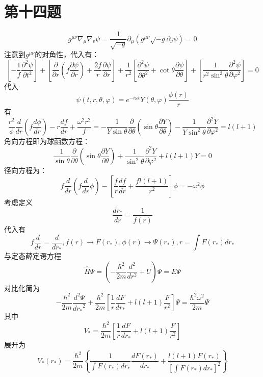 \documentclass[a4paper]{ctexart}
\begin{document}
\section{第十四题}
$$
    g^{\mu \nu}\nabla _{\mu}\nabla _v\psi =\frac{1}{\sqrt{-g}}\partial _{\mu}\left( g^{\mu \nu}\sqrt{-g}\partial _{\nu}\psi \right) =0
$$
注意到$g^{\mu \nu}$的对角性，代入有：
$$
    \left[ -\frac{1}{f}\frac{\partial ^2\psi}{\partial t^2} \right] +\left[ \frac{\partial}{\partial r}\left( f\frac{\partial \psi}{\partial r} \right) +\frac{2f}{r}\frac{\partial \psi}{\partial r} \right] +\frac{1}{r^2}\left[ \frac{\partial ^2\psi}{\partial \theta ^2}+\cot \theta \frac{\partial \psi}{\partial \theta} \right] +\left[ \frac{1}{r^2\sin ^2\theta}\frac{\partial ^2\psi}{\partial \varphi ^2} \right] =0
$$
代入
$$
    \psi \left( t,r,\theta ,\varphi \right) =e^{-i\omega t}Y\left( \theta ,\varphi \right) \frac{\phi \left( r \right)}{r}
$$
有
$$
    \frac{r^2}{\phi}\frac{d}{dr}\left( f\frac{d\phi}{dr} \right) -r\frac{df}{dr}+\frac{\omega ^2r^2}{f}=-\frac{1}{Y\sin \theta}\frac{\partial}{\partial \theta}\left( \sin \theta \frac{\partial Y}{\partial \theta} \right) -\frac{1}{Y\sin ^2\theta}\frac{\partial ^2Y}{\partial \varphi ^2}=l\left( l+1 \right)
$$
角向方程即为球函数方程：
$$
    \frac{1}{\sin \theta}\frac{\partial}{\partial \theta}\left( \sin \theta \frac{\partial Y}{\partial \theta} \right) +\frac{1}{\sin ^2\theta}\frac{\partial ^2Y}{\partial \varphi ^2}+l\left( l+1 \right) Y=0
$$
径向方程为：
$$
    f\frac{d}{dr}\left( f\frac{d}{dr}\phi \right) -\left[ \frac{f}{r}\frac{df}{dr}+\frac{fl\left( l+1 \right)}{r^2} \right] \phi =-\omega ^2\phi
$$
考虑定义
$$
    \frac{dr_*}{dr}=\frac{1}{f\left( r \right)}
$$
代入有
$$
    f\frac{d}{dr}=\frac{d}{dr_*},f\left( r \right) \rightarrow F\left( r_* \right) ,\phi \left( r \right) \rightarrow \Psi \left( r_* \right) ,r=\int{F\left( r_* \right) dr_*}
$$
与定态薛定谔方程
$$
    \hat{H}\Psi =\left( -\frac{\hbar^2}{2m}\frac{d^2}{dr^2}+U \right) \Psi =E\Psi
$$
对比化简为
$$
    -\frac{\hbar^2}{2m}\frac{d^2\Psi}{{dr_*}^2}+\frac{\hbar^2}{2m}\left[ \frac{1}{r}\frac{dF}{dr_*}+l\left( l+1 \right) \frac{F}{r^2} \right] \Psi =\frac{\hbar^2\omega ^2}{2m}\Psi
$$
其中
$$
    V_*=\frac{\hbar^2}{2m}\left[ \frac{1}{r}\frac{dF}{dr_*}+l\left( l+1 \right) \frac{F}{r^2} \right]
$$
展开为
$$
    V_*\left( r_* \right) =\frac{\hbar^2}{2m}\left\{ \frac{1}{\int{F\left( r_* \right) dr_*}}\frac{dF\left( r_* \right)}{dr_*}+\frac{l\left( l+1 \right) F\left( r_* \right)}{\left[ \int{F\left( r_* \right) dr_*} \right] ^2} \right\}
$$
\end{document}
